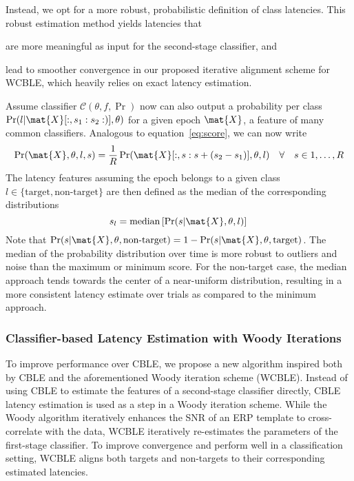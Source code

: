 Instead, we opt for a more robust, probabilistic definition of class latencies.
This robust estimation method yields latencies that
\begin{enumerate*}[label=(\arabic*)]
  \item are more meaningful as input for the second-stage
    classifier, and
  \item lead to smoother convergence in our proposed iterative alignment scheme
    for WCBLE, which heavily relies on exact latency estimation.
\end{enumerate*}
Assume classifier $\mathcal{C}(\theta,f,\Pr)$ now can also output a probability
per class $\Pr(l|
\mat{X}[:,s_1:s_2:)], \theta)$ for a given epoch $\mat{X}$, a feature of many
common classifiers.
Analogous to equation~\ref{eq:score}, we can now write
\begin{equation}
\Pr(\mat{X},\theta,l,s) = \frac{1}{R}\Pr(\mat{X}[:,s:s+(s_2-s_1)],\theta,l)
  \quad \forall \quad s\in 1,\ldots,R
	\label{eq:prob}
\end{equation}
The latency features assuming the epoch belongs to a given class
$l\in\{\textrm{target},\textrm{non-target}\}$ are then defined as the median of
the corresponding  distributions
\begin{equation}
  s_l =\mathrm{median}\left[\Pr(s|\mat{X},\theta,l) \right] \\
  \label{eq:prob-latency}
\end{equation}
Note that $  \Pr(s|\mat{X},\theta,\textrm{non-target}) =1-
  \Pr(s|\mat{X},\theta,\mathrm{target})$.
The median of the probability distribution over time is more robust to
outliers and noise than the maximum or minimum score.
For the non-target case, the median approach tends towards the center of a
near-uniform distribution, resulting in a more consistent latency estimate over
trials as compared to the minimum approach.

\subsubsection{Classifier-based Latency Estimation with Woody
	Iterations}
To improve performance over CBLE, we propose a new algorithm inspired both by
CBLE and the aforementioned Woody iteration scheme (WCBLE).
Instead of using CBLE to estimate the features of a second-stage classifier
directly, CBLE latency estimation is used as a step in a Woody iteration scheme.
While the Woody algorithm iteratively enhances the SNR of an ERP template to
cross-correlate with the data, WCBLE iteratively re-estimates the parameters of
the first-stage classifier.
To improve convergence and perform well in a classification setting, WCBLE
aligns both targets and non-targets to their corresponding estimated latencies.

